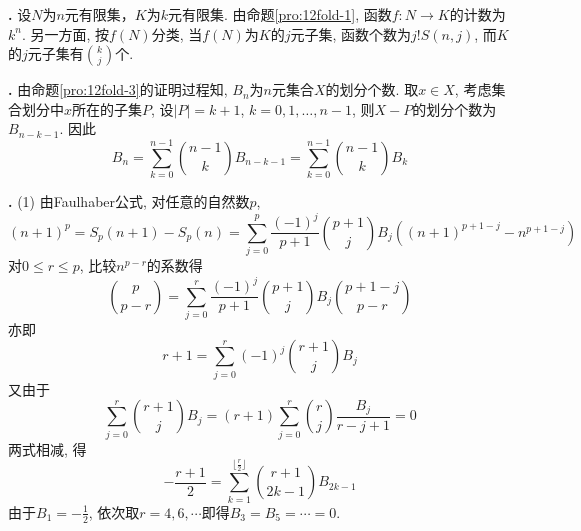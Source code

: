 \par \textbf{\thesolenum .} 设$N$为$n$元有限集，$K$为$k$元有限集. 由命题\ref{pro:12fold-1}, 函数$f: N\to K$的计数为$k^n$. 另一方面, 按$f(N)$分类, 当$f(N)$为$K$的$j$元子集, 函数个数为$j!S(n,j)$, 而$K$的$j$元子集有$\binom{k}{j}$个. 

\par \textbf{\thesolenum .} \cite{IC} 由命题\ref{pro:12fold-3}的证明过程知, $B_n$为$n$元集合$X$的划分个数. 取$x\in X$, 考虑集合划分中$x$所在的子集$P$, 设$|P|=k+1$, $k=0,1,\dots,n-1$, 则$X-P$的划分个数为$B_{n-k-1}$. 因此
\begin{equation*}
    B_n = \sum_{k=0}^{n-1} \binom{n-1}{k} B_{n-k-1} = \sum_{k=0}^{n-1} \binom{n-1}{k} B_{k}
\end{equation*}

\par \textbf{\thesolenum .}
(1) \cite{SMI} 由Faulhaber公式, 对任意的自然数$p$, 
\begin{equation}
    (n+1)^p=S_p(n+1)-S_p(n)=\sum_{j=0}^p \frac{(-1)^j}{p+1} \binom{p+1}{j}B_j ((n+1)^{p+1-j}-n^{p+1-j})
\end{equation}
对$0\le r\le p$, 比较$n^{p-r}$的系数得 
\begin{equation}
    \binom{p}{p-r}=\sum_{j=0}^{r} \frac{(-1)^j}{p+1} \binom{p+1}{j}B_j \binom{p+1-j}{p-r}
\end{equation}
亦即
\begin{equation}
r+1=\sum_{j=0}^{r} (-1)^j \binom{r+1}{j}B_j
\end{equation}
又由于
\begin{equation}
\sum_{j=0}^{r} \binom{r+1}{j}B_j=(r+1)\sum_{j=0}^{r} \binom{r}{j}\frac{B_j}{r-j+1}=0
\end{equation}
两式相减, 得
\begin{equation}
    -\frac{r+1}{2}=\sum_{k=1}^{\lfloor \frac{r}{2}\rfloor} \binom{r+1}{2k-1} B_{2k-1}
\end{equation}
由于$B_1=-\frac{1}{2}$, 依次取$r=4,6,\cdots$即得$B_3=B_5=\cdots=0$. 

